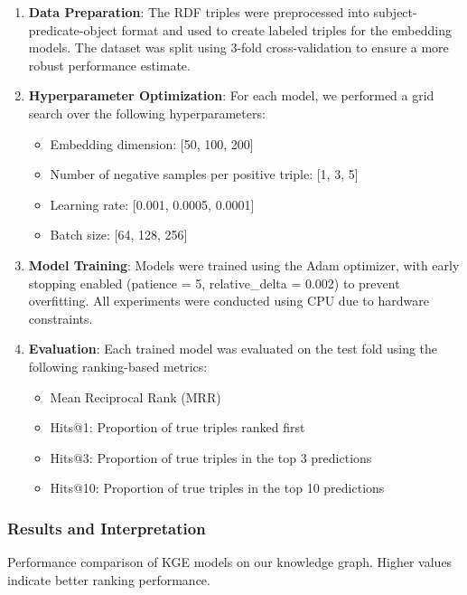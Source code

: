\documentclass[10pt,a4paper]{article}
\begin{document}
\begin{enumerate}
    \item \textbf{Data Preparation}: The RDF triples were preprocessed into subject-predicate-object format and used to create labeled triples for the embedding models. The dataset was split using 3-fold cross-validation to ensure a more robust performance estimate.
    
    \item \textbf{Hyperparameter Optimization}: For each model, we performed a grid search over the following hyperparameters:
    \begin{itemize}
        \item Embedding dimension: [50, 100, 200]
        \item Number of negative samples per positive triple: [1, 3, 5]
        \item Learning rate: [0.001, 0.0005, 0.0001]
        \item Batch size: [64, 128, 256]
    \end{itemize}
    
    \item \textbf{Model Training}: Models were trained using the Adam optimizer, with early stopping enabled (patience = 5, relative\_delta = 0.002) to prevent overfitting. All experiments were conducted using CPU due to hardware constraints.

    \item \textbf{Evaluation}: Each trained model was evaluated on the test fold using the following ranking-based metrics:
    \begin{itemize}
        \item Mean Reciprocal Rank (MRR)
        \item Hits@1: Proportion of true triples ranked first
        \item Hits@3: Proportion of true triples in the top 3 predictions
        \item Hits@10: Proportion of true triples in the top 10 predictions
    \end{itemize}
\end{enumerate}

\subsubsection{Results and Interpretation}

\begin{table}[H]
    \centering
    
    \caption{Performance comparison of KGE models on our knowledge graph. Higher values indicate better ranking performance.}
    \label{tab:model_comparison}
\end{table}
\end{document}
